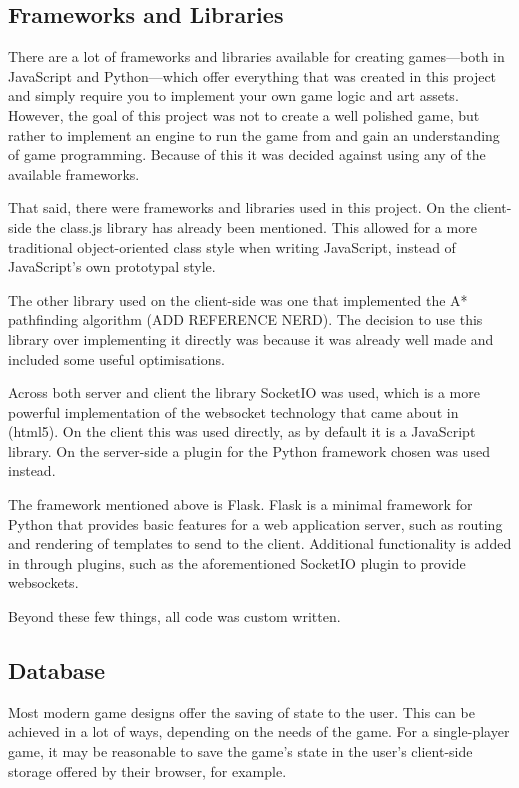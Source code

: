 \subsection{Frameworks and Libraries}
There are a lot of frameworks and libraries available for creating games---both in JavaScript and Python---which offer everything that was created in this project and simply require you to implement your own game logic and art assets. However, the goal of this project was not to create a well polished game, but rather to implement an engine to run the game from and gain an understanding of game programming. Because of this it was decided against using any of the available frameworks.

That said, there were frameworks and libraries used in this project. On the client-side the class.js library has already been mentioned. This allowed for a more traditional object-oriented class style when writing JavaScript, instead of JavaScript's own prototypal style.

The other library used on the client-side was one that implemented the A* pathfinding algorithm (ADD REFERENCE NERD). The decision to use this library over implementing it directly was because it was already well made and included some useful optimisations.

Across both server and client the library SocketIO was used, which is a more powerful implementation of the websocket technology that came about in \textsc(html5). On the client this was used directly, as by default it is a JavaScript library. On the server-side a plugin for the Python framework chosen was used instead.

The framework mentioned above is Flask. Flask is a minimal framework for Python that provides basic features for a web application server, such as routing and rendering of templates to send to the client. Additional functionality is added in through plugins, such as the aforementioned SocketIO plugin to provide websockets.

Beyond these few things, all code was custom written.

\subsection{Database}
Most modern game designs offer the saving of state to the user. This can be achieved in a lot of ways, depending on the needs of the game. For a single-player game, it may be reasonable to save the game's state in the user's client-side storage offered by their browser, for example.

